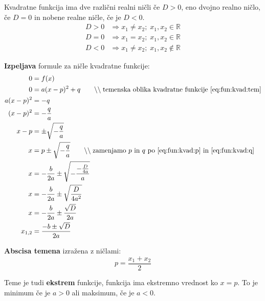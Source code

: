 \documentclass[a4paper,oneside,12pt,fleqn]{article}
\def\R{\ensuremath{\mathbb R}}
\newcommand{\comment}[1]{\ensuremath{\qquad\backslash\backslash\;}\textnormal{#1}}
\renewcommand\implies\Rightarrow
\numberwithin{equation}{section}
\begin{document}
Kvadratne funkcija ima dve različni realni ničli če $D > 0$, eno dvojno realno ničlo, če
$D = 0$ in nobene realne ničle, če je $D < 0$.
\begin{align*}
  D > 0 &\implies x_1 \neq x_2; \; x_1, x_2 \in \R \\
  D = 0 &\implies x_1 = x_2; \; x_1, x_2 \in \R \\
  D < 0 &\implies x_1 \neq x_2; \; x_1, x_2 \notin \R
\end{align*}

\textbf{Izpeljava} formule za ničle kvadratne funkcije:
\begin{align*}
  0 &= f(x) \\
  0 &= a(x-p)^2 + q \comment{temenska oblika kvadratne funkcije \eqref{eq:fun:kvad:tem}} \\
  a(x-p)^2 &= -q \\
  (x-p)^2 &= -\frac{q}{a} \\
  x-p &= \pm \sqrt{-\frac{q}{a}} \\
  x &= p \pm \sqrt{-\frac{q}{a}} \comment{zamenjamo $p$ in $q$ po 
  \eqref{eq:fun:kvad:p} in \eqref{eq:fun:kvad:q}} \\
  x &= - \frac{b}{2a} \pm \sqrt{-\frac{-\frac{D}{4a}}{a}} \\
  x &= - \frac{b}{2a} \pm \sqrt{\frac{D}{4a^2}} \\
  x &= - \frac{b}{2a} \pm \frac{\sqrt{D}}{2a} \\
  x_{1,2} &= \frac{-b \pm \sqrt{D}}{2a}
\end{align*}

\textbf{Abscisa temena} izražena z ničlami:
\[ p = \frac{x_1+x_2}{2} \]

Teme je tudi \textbf{ekstrem} funkcije, funkcija ima ekstremno vrednost ko $x = p$. To je
minimum če je $a > 0$ ali maksimum, če je $a < 0$.
\end{document}
